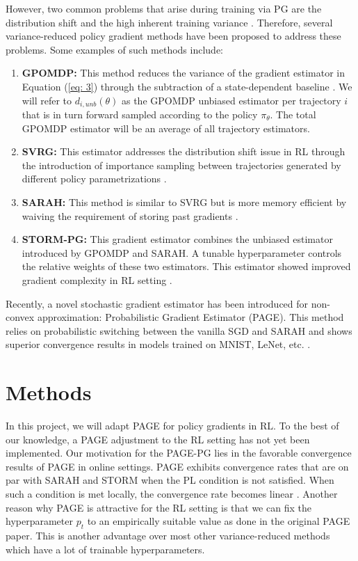 \documentclass[10pt,twocolumn,letterpaper]{article}
\begin{document}
However, two common problems that arise during training via PG are the distribution shift and the high inherent training variance  \cite{RN12}. Therefore, several variance-reduced policy gradient methods have been proposed to address these problems. Some examples of such methods include:
\begin{enumerate}
    \item \textbf{GPOMDP:} This method reduces the variance of the gradient estimator in Equation (\ref{eq: 3}) through the subtraction of a state-dependent baseline \cite{RN14}. We will refer to $d_{i,unb}(\theta)$ as the GPOMDP unbiased estimator per trajectory $i$ that is in turn forward sampled according to the policy $\pi_{\theta}$. The total GPOMDP estimator will be an average of all trajectory estimators.  

    \item \textbf{SVRG:} This estimator addresses the distribution shift issue in RL through the introduction of importance sampling between trajectories generated by different policy parametrizations \cite{RN17}.
    \item \textbf{SARAH:} This method is similar to SVRG but is more memory efficient by waiving the requirement of storing past gradients \cite{RN3}. 
    \item \textbf{STORM-PG:} This gradient estimator combines the unbiased estimator introduced by GPOMDP and SARAH. A tunable hyperparameter controls the relative weights of these two estimators. This estimator showed improved gradient complexity in RL setting \cite{RN1}.
\end{enumerate}
Recently, a novel stochastic gradient estimator has been introduced for non-convex approximation: Probabilistic Gradient Estimator (PAGE). This method relies on probabilistic switching between the vanilla SGD and SARAH and shows superior convergence results in models trained on MNIST, LeNet, etc. \cite{RN2}.

\section{Methods}

In this project, we will adapt PAGE for policy gradients in RL. To the best of our knowledge, a PAGE adjustment to the RL setting has not yet been implemented. Our motivation for the PAGE-PG lies in the favorable convergence results of PAGE in online settings. PAGE exhibits convergence rates that are on par with SARAH and STORM when the PL condition is not satisfied. When such a condition is met locally, the convergence rate becomes linear \cite{RN2}.  Another reason why PAGE is attractive for the RL setting is that we can fix the hyperparameter $p_{t}$ to an empirically suitable value as done in the original PAGE paper. This is another advantage over most other variance-reduced methods which have a lot of trainable hyperparameters.  
\end{document}
